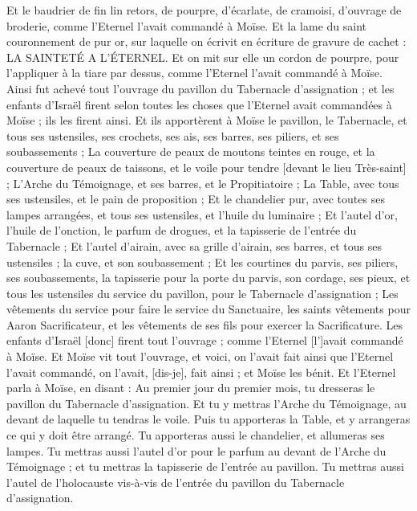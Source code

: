 \begin{multicols}{2}
Et le baudrier de fin lin retors, de pourpre, d'écarlate, de cramoisi, d'ouvrage de broderie, comme l'Eternel l'avait commandé à Moïse.
Et la lame du saint couronnement de pur or, sur laquelle on écrivit en écriture de gravure de cachet : LA SAINTETÉ A L'ÉTERNEL.
Et on mit sur elle un cordon de pourpre, pour l'appliquer à la tiare par dessus, comme l'Eternel l'avait commandé à Moïse.
Ainsi fut achevé tout l'ouvrage du pavillon du Tabernacle d'assignation ; et les enfants d'Israël firent selon toutes les choses que l'Eternel avait commandées à Moïse ; ils les firent ainsi.
Et ils apportèrent à Moïse le pavillon, le Tabernacle, et tous ses ustensiles, ses crochets, ses ais, ses barres, ses piliers, et ses soubassements ;
La couverture de peaux de moutons teintes en rouge, et la couverture de peaux de taissons, et le voile pour tendre [devant le lieu Très-saint] ;
L'Arche du Témoignage, et ses barres, et le Propitiatoire ;
La Table, avec tous ses ustensiles, et le pain de proposition ;
Et le chandelier pur, avec toutes ses lampes arrangées, et tous ses ustensiles, et l'huile du luminaire ;
Et l'autel d'or, l'huile de l'onction, le parfum de drogues, et la tapisserie de l’entrée du Tabernacle ;
Et l'autel d'airain, avec sa grille d'airain, ses barres, et tous ses ustensiles ; la cuve, et son soubassement ;
Et les courtines du parvis, ses piliers, ses soubassements, la tapisserie pour la porte du parvis, son cordage, ses pieux, et tous les ustensiles du service du pavillon, pour le Tabernacle d'assignation ;
Les vêtements du service pour faire le service du Sanctuaire, les saints vêtements pour Aaron Sacrificateur, et les vêtements de ses fils pour exercer la Sacrificature.
Les enfants d'Israël [donc] firent tout l'ouvrage ; comme l'Eternel [l']avait commandé à Moïse.
Et Moïse vit tout l'ouvrage, et voici, on l'avait fait ainsi que l'Eternel l'avait commandé, on l'avait, [dis-je], fait ainsi ; et Moïse les bénit.
\VerseOne{}Et l'Eternel parla à Moïse, en disant :
Au premier jour du premier mois, tu dresseras le pavillon du Tabernacle d'assignation.
Et tu y mettras l'Arche du Témoignage, au devant de laquelle tu tendras le voile.
Puis tu apporteras la Table, et y arrangeras ce qui y doit être arrangé. Tu apporteras aussi le chandelier, et allumeras ses lampes.
Tu mettras aussi l'autel d'or pour le parfum au devant de l'Arche du Témoignage ; et tu mettras la tapisserie de l'entrée au pavillon.
Tu mettras aussi l'autel de l'holocauste vis-à-vis de l'entrée du pavillon du Tabernacle d'assignation.

\end{multicols}
